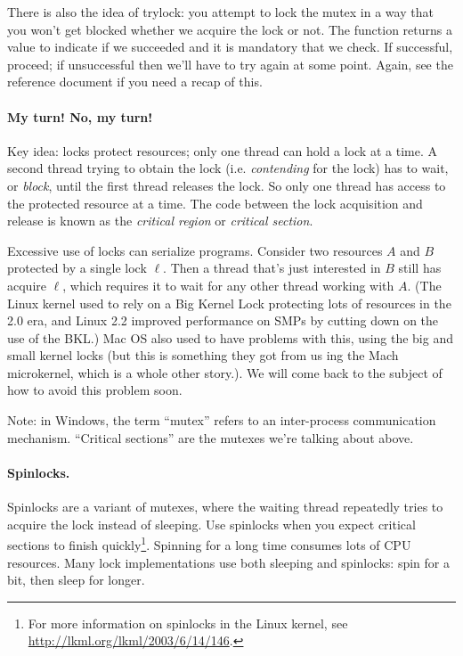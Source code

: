 \documentclass[a4paper]{report}
\begin{document}
There is also the idea of trylock: you attempt to lock the mutex in a way that you won't get blocked whether we acquire the lock or not. The function returns a value to indicate if we succeeded and it is mandatory that we check. If successful, proceed; if unsuccessful then we'll have to try again at some point. Again, see the reference document if you need a recap of this.



\paragraph{My turn! No, my turn!} Key idea: locks protect resources; only one thread
can hold a lock at a time. A second thread trying to obtain the lock
(i.e. \emph{contending} for the lock) has to wait, or \emph{block},
until the first thread releases the lock. So only one thread has
access to the protected resource at a time. The code between the lock
acquisition and release is known as the \emph{critical region} or \emph{critical section}.

Excessive use of locks can serialize programs. Consider two resources
$A$ and $B$ protected by a single lock $\ell$. Then a thread that's
just interested in $B$ still has acquire $\ell$, which requires it to
wait for any other thread working with $A$. (The Linux kernel used to
rely on a Big Kernel Lock protecting lots of resources in the 2.0 era,
and Linux 2.2 improved performance on SMPs by cutting down on the use
of the BKL.) Mac OS also used to have problems with this, using the
big and small kernel locks (but this is something they got from us ing
the Mach microkernel, which is a whole other story.). We will come back to
the subject of how to avoid this problem soon.

Note: in Windows, the term ``mutex'' refers to an inter-process
communication mechanism. ``Critical sections'' are the mutexes we're
talking about above.

\paragraph{Spinlocks.} Spinlocks are a variant of mutexes, where the
waiting thread repeatedly tries to acquire the lock instead of sleeping.
Use spinlocks when you expect critical sections to finish 
quickly\footnote{For more information on spinlocks in the Linux
kernel, see \url{http://lkml.org/lkml/2003/6/14/146}.}. Spinning
for a long time consumes lots of CPU resources. Many lock
implementations use both sleeping and spinlocks: spin for a bit,
then sleep for longer. 
\end{document}
